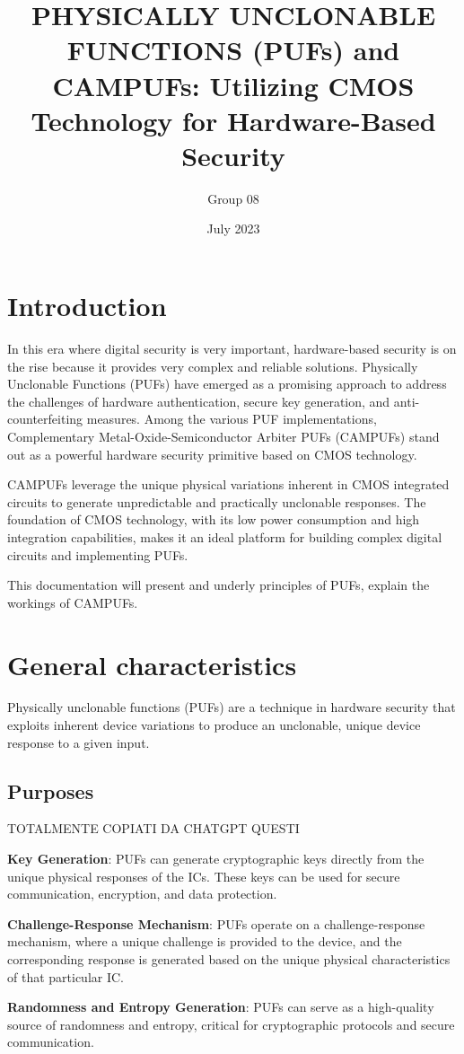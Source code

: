 \documentclass{article}
\title{\textbf{PHYSICALLY UNCLONABLE FUNCTIONS (PUFs) and CAMPUFs: Utilizing CMOS Technology for Hardware-Based Security}}
\author{ Group 08 } %
\date{July 2023}
\begin{document}
\maketitle
\section{Introduction}
In this era where digital security is very important, hardware-based security is on the rise because it provides very complex and reliable solutions. Physically Unclonable Functions (PUFs) have emerged as a promising approach to address the challenges of hardware authentication, secure key generation, and anti-counterfeiting measures. Among the various PUF implementations, Complementary Metal-Oxide-Semiconductor Arbiter PUFs (CAMPUFs) stand out as a powerful hardware security primitive based on CMOS technology.

CAMPUFs leverage the unique physical variations inherent in CMOS integrated circuits to generate unpredictable and practically unclonable responses. The foundation of CMOS technology, with its low power consumption and high integration capabilities, makes it an ideal platform for building complex digital circuits and implementing PUFs.

This documentation will present and underly principles of PUFs, explain the workings of CAMPUFs.
\section{General characteristics}
Physically unclonable functions (PUFs) are a technique in hardware security that exploits inherent device variations to produce an unclonable, unique device response to a given input.
\subsection{Purposes} TOTALMENTE COPIATI DA CHATGPT QUESTI

\textbf{Key Generation}: PUFs can generate cryptographic keys directly from the unique physical responses of the ICs. These keys can be used for secure communication, encryption, and data protection.

\textbf{Challenge-Response Mechanism}: PUFs operate on a challenge-response mechanism, where a unique challenge is provided to the device, and the corresponding response is generated based on the unique physical characteristics of that particular IC.

\textbf{Randomness and Entropy Generation}: PUFs can serve as a high-quality source of randomness and entropy, critical for cryptographic protocols and secure communication.
\end{document}
